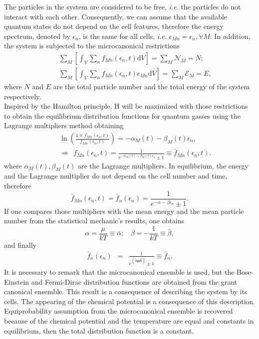 \documentclass{article}
\begin{document}
The particles in the system are considered to be free, \textit{i.e.} the particles do not interact with each other.
Consequently, we can assume that the available quantum states do not depend on the cell features,
therefore the energy spectrum, denoted by $\epsilon_n$, is the same for all cells, \textit{i.e.} $\epsilon_{Mn} = \epsilon_n, \forall M$. In addition, the system is subjected to the microcanonical restrictions
\begin{eqnarray}
    &&\sum_{M} \left[\int_V \sum_{n}f_{Mn}(\epsilon_{n} ,t)\mathrm{d}V\right]=\sum_{M} {\mathcal{N}}_{M}=N; \nonumber \\
    &&\sum_{M}\left[\int_V \sum_{n}f_{Mn}(\epsilon_{n},t)\epsilon_{Mn}\mathrm{d}V\right]=\sum_M {\mathcal{E}}_M=E, \label{restriccions1}
\end{eqnarray}
where $N$ and $E$ are the total particle number and the total energy of the system respectively.\\ 
Inspired by the Hamilton principle, H will be maximized with those restrictions to obtain the equilibrium distribution functions for quantum gasses using the Lagrange multipliers method obtaining
\begin{eqnarray}
&&\ln \left(\frac{1\mp f_{Mn}(\epsilon_{n},t)}{f_{Mn}(\epsilon_{n},t)} \right)=-\alpha_M(t)-\beta_M(t) \epsilon_{n}, \label{relation}\\ &&\Rightarrow \ \ f_{Mn}(\epsilon_{n},t)=\frac{1}{e^{-\alpha_M(t)-\beta_M(t) \epsilon_{n}}\pm 1} \equiv \bar{f}_{Mn}(\epsilon_{n},t) \label{distributionequilibrium}.
\end{eqnarray}
where $\alpha_M(t), \beta_M(t)$ are the Lagrange multipliers. In equilibrium, the energy and the Lagrange multiplier do not depend on the cell number and time, therefore
\begin{equation}
    \bar f_{Mn}(\epsilon_{n},t)=\bar f_n(\epsilon_{n}) =\frac{1}{e^{-\alpha-\beta \epsilon_n}\pm 1}.
\end{equation}{}
If one compares those multipliers with the mean energy and the mean particle number from the statistical mechanic's results, one obtains
\begin{equation}
    \alpha=\frac{\mu}{kT}\equiv \bar{\alpha}; \ \ \ \ \beta=-\frac{1}{kT}\equiv \bar{\beta},
\end{equation}{}
and finally
\begin{eqnarray}
    \bar{f}_{n}(\epsilon_{n})&=&\frac{1}{e^{(\frac{{\epsilon_n}-\bar{\mu}}{kT})}\pm 1}\equiv \bar{f}_{n}.
\end{eqnarray}{}
It is necessary to remark that the microcanonical ensemble is used, but the Bose-Einstein and Fermi-Dirac distribution functions are obtained from the grant canonical ensemble. This result is a consequence of describing the system by its cells. The appearing of the chemical potential is a consequence of this description. Equiprobability assumption from the microcanonical ensemble is recovered because of the chemical potential and the temperature are equal and constants in equilibrium, then the total distribution function is a constant.\\    
\end{document}
